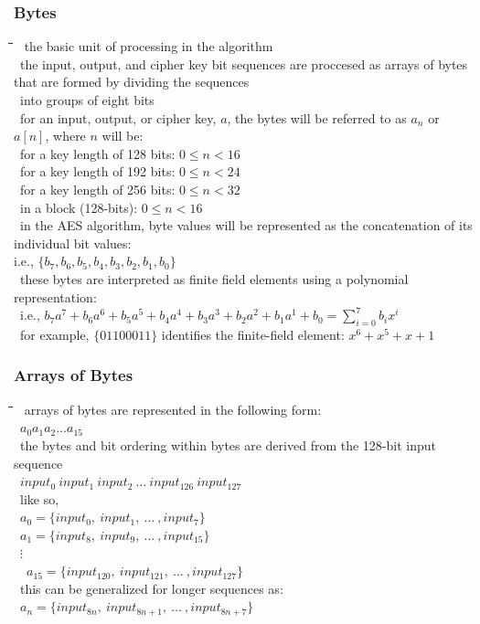 \documentclass[10pt,letterpaper]{scrartcl}
\newcommand{\tbul}{\textbullet}
\newcommand{\tend}{\>\textendash}
\newcommand{\tasc}{\>\>\textasteriskcentered}
\newcommand{\tabDef}{\hspace{2em}\=\hspace{2em}\=\hspace{2em}\=\hspace{2em}\=\kill}
\begin{document}
	\subsubsection*{Bytes}\begin{tabbing}\tabDef 
	\tbul\ the basic unit of processing in the algorithm \\
	\tbul\ the input, output, and cipher key bit sequences are proccesed as arrays of bytes that are formed by dividing the sequences\\ \>\ into groups of eight bits \\
	\tbul\ for an input, output, or cipher key, $a$, the bytes will be referred to as $a_n$ or $a[n]$, where $n$ will be:  \\
	\tasc\ for a key length of 128 bits: $0\leq n < 16$ \\
	\tasc\ for a key length of 192 bits: $0\leq n < 24$ \\
	\tasc\ for a key length of 256 bits: $0\leq n < 32$ \\
	\tasc\ in a block (128-bits): $0\leq n < 16$ \\
	\tbul\ in the AES algorithm, byte values will be represented as the concatenation of its individual bit values: \\ i.e., $\{b_7, b_6, b_5, b_4, b_3, b_2, b_1, b_0\}$\\
	\tend\ these bytes are interpreted as finite field elements using a polynomial representation: \\ 
	\>\>\ i.e., $\displaystyle b_7a^7+b_6a^6+b_5a^5+b_4a^4+b_3a^3+b_2a^2+b_1a^1+b_0 = \sum_{i=0}^7 b_ix^i$ \\
	\tend\ for example, $\{01100011\}$ identifies the finite-field element: $x^6 + x^5+x+1$\end{tabbing}
	\subsubsection*{Arrays of Bytes}\begin{tabbing}\tabDef
	\tbul\ arrays of bytes are represented in the following form: \\
	\tend\ $a_0a_1a_2\ldots a_{15}$ \\
	\tbul\ the bytes and bit ordering within bytes are derived from the 128-bit input sequence \\
	\tend\ $input_0\ input_1\ input_2\ \ldots\ input_{126}\ input_{127}$ \\
	\tbul\ like so, \\
	\tend\ $a_0 = \{input_0,\ input_1,\ \ldots\ , input_7\}$ \\
	\tend\ $a_1 = \{input_8,\ input_9,\ \ldots\ , input_{15}\}$ \\
	\>\>\ $\vdots$ \\
	\tend\ \tend\ $a_{15} = \{input_{120},\ input_{121},\ \ldots\ , input_{127}\}$ \\
	\tbul\ this can be generalized for longer sequences as: \\
	\tend\ $a_n = \{input_{8n},\ input_{8n+1}, \ \ldots\ , input_{8n+7}\}$\end{tabbing}
\end{document}
